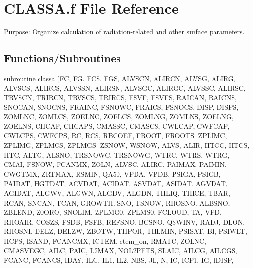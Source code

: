 \hypertarget{CLASSA_8f}{}\section{C\+L\+A\+S\+S\+A.\+f File Reference}
\label{CLASSA_8f}


Purpose\+: Organize calculation of radiation-\/related and other surface parameters.  


\subsection*{Functions/\+Subroutines}
\begin{DoxyCompactItemize}
\item 
subroutine \hyperlink{CLASSA_8f_a4ba5845339f63dd223722f0e0593c72e}{classa} (F\+C, F\+G, F\+C\+S, F\+G\+S, A\+L\+V\+S\+C\+N, A\+L\+I\+R\+C\+N, A\+L\+V\+S\+G, A\+L\+I\+R\+G, A\+L\+V\+S\+C\+S, A\+L\+I\+R\+C\+S, A\+L\+V\+S\+S\+N, A\+L\+I\+R\+S\+N, A\+L\+V\+S\+G\+C, A\+L\+I\+R\+G\+C, A\+L\+V\+S\+S\+C, A\+L\+I\+R\+S\+C, T\+R\+V\+S\+C\+N, T\+R\+I\+R\+C\+N, T\+R\+V\+S\+C\+S, T\+R\+I\+R\+C\+S, F\+S\+V\+F, F\+S\+V\+F\+S, R\+A\+I\+C\+A\+N, R\+A\+I\+C\+N\+S, S\+N\+O\+C\+A\+N, S\+N\+O\+C\+N\+S, F\+R\+A\+I\+N\+C, F\+S\+N\+O\+W\+C, F\+R\+A\+I\+C\+S, F\+S\+N\+O\+C\+S, D\+I\+S\+P, D\+I\+S\+P\+S, Z\+O\+M\+L\+N\+C, Z\+O\+M\+L\+C\+S, Z\+O\+E\+L\+N\+C, Z\+O\+E\+L\+C\+S, Z\+O\+M\+L\+N\+G, Z\+O\+M\+L\+N\+S, Z\+O\+E\+L\+N\+G, Z\+O\+E\+L\+N\+S, C\+H\+C\+A\+P, C\+H\+C\+A\+P\+S, C\+M\+A\+S\+S\+C, C\+M\+A\+S\+C\+S, C\+W\+L\+C\+A\+P, C\+W\+F\+C\+A\+P, C\+W\+L\+C\+P\+S, C\+W\+F\+C\+P\+S, R\+C, R\+C\+S, R\+B\+C\+O\+E\+F, F\+R\+O\+O\+T, F\+R\+O\+O\+T\+S, Z\+P\+L\+I\+M\+C, Z\+P\+L\+I\+M\+G, Z\+P\+L\+M\+C\+S, Z\+P\+L\+M\+G\+S, Z\+S\+N\+O\+W, W\+S\+N\+O\+W, A\+L\+V\+S, A\+L\+I\+R, H\+T\+C\+C, H\+T\+C\+S, H\+T\+C, A\+L\+T\+G, A\+L\+S\+N\+O, T\+R\+S\+N\+O\+W\+C, T\+R\+S\+N\+O\+W\+G, W\+T\+R\+C, W\+T\+R\+S, W\+T\+R\+G, C\+M\+A\+I, F\+S\+N\+O\+W, F\+C\+A\+N\+M\+X, Z\+O\+L\+N, A\+L\+V\+S\+C, A\+L\+I\+R\+C, P\+A\+I\+M\+A\+X, P\+A\+I\+M\+I\+N, C\+W\+G\+T\+M\+X, Z\+R\+T\+M\+A\+X, R\+S\+M\+I\+N, Q\+A50, V\+P\+D\+A, V\+P\+D\+B, P\+S\+I\+G\+A, P\+S\+I\+G\+B, P\+A\+I\+D\+A\+T, H\+G\+T\+D\+A\+T, A\+C\+V\+D\+A\+T, A\+C\+I\+D\+A\+T, A\+S\+V\+D\+A\+T, A\+S\+I\+D\+A\+T, A\+G\+V\+D\+A\+T, A\+G\+I\+D\+A\+T, A\+L\+G\+W\+V, A\+L\+G\+W\+N, A\+L\+G\+D\+V, A\+L\+G\+D\+N, T\+H\+L\+I\+Q, T\+H\+I\+C\+E, T\+B\+A\+R, R\+C\+A\+N, S\+N\+C\+A\+N, T\+C\+A\+N, G\+R\+O\+W\+T\+H, S\+N\+O, T\+S\+N\+O\+W, R\+H\+O\+S\+N\+O, A\+L\+B\+S\+N\+O, Z\+B\+L\+E\+N\+D, Z0\+O\+R\+O, S\+N\+O\+L\+I\+M, Z\+P\+L\+M\+G0, Z\+P\+L\+M\+S0, F\+C\+L\+O\+U\+D, T\+A, V\+P\+D, R\+H\+O\+A\+I\+R, C\+O\+S\+Z\+S, F\+S\+D\+B, F\+S\+F\+B, R\+E\+F\+S\+N\+O, B\+C\+S\+N\+O, Q\+S\+W\+I\+N\+V, R\+A\+D\+J, D\+L\+O\+N, R\+H\+O\+S\+N\+I, D\+E\+L\+Z, D\+E\+L\+Z\+W, Z\+B\+O\+T\+W, T\+H\+P\+O\+R, T\+H\+L\+M\+I\+N, P\+S\+I\+S\+A\+T, B\+I, P\+S\+I\+W\+L\+T, H\+C\+P\+S, I\+S\+A\+N\+D, F\+C\+A\+N\+C\+M\+X, I\+C\+T\+E\+M, ctem\+\_\+on, R\+M\+A\+T\+C, Z\+O\+L\+N\+C, C\+M\+A\+S\+V\+E\+G\+C, A\+I\+L\+C, P\+A\+I\+C, L2\+M\+A\+X, N\+O\+L2\+P\+F\+T\+S, S\+L\+A\+I\+C, A\+I\+L\+C\+G, A\+I\+L\+C\+G\+S, F\+C\+A\+N\+C, F\+C\+A\+N\+C\+S, I\+D\+A\+Y, I\+L\+G, I\+L1, I\+L2, N\+B\+S, J\+L, N, I\+C, I\+C\+P1, I\+G, I\+D\+I\+S\+P, 
\end{DoxyCompactItemize}
